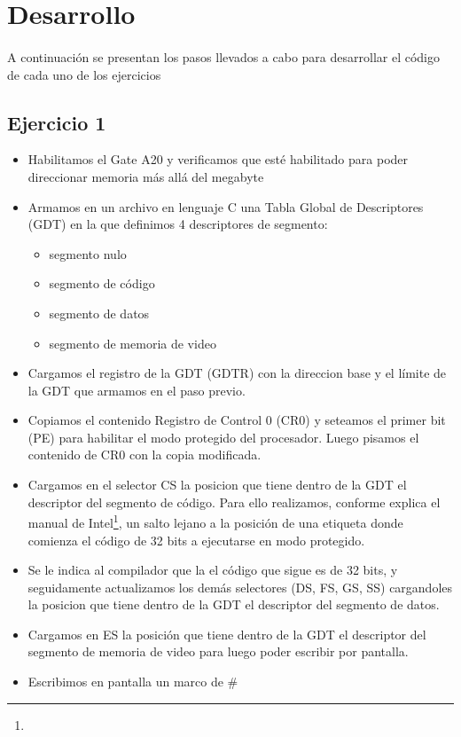 \section{Desarrollo}
\paragraph{}
A continuaci\'on se presentan los pasos llevados a cabo para desarrollar el c\'odigo de cada uno de los ejercicios

\subsection{Ejercicio 1}
\begin{itemize}
 \item Habilitamos el Gate A20 y verificamos que est\'e habilitado para poder direccionar memoria m\'as all\'a del megabyte
 \item Armamos en un archivo en lenguaje C una Tabla Global de Descriptores (GDT) en la que definimos 4 descriptores de segmento: 
	\begin{itemize}
	\item segmento nulo
	\item segmento de c\'odigo
	\item segmento de datos
	\item segmento de memoria de video
	\end{itemize}

 \item Cargamos el registro de la GDT (GDTR) con la direccion base  y el l\'imite de la GDT que armamos en el paso previo.

 \item Copiamos el contenido Registro de Control 0 (CR0) y seteamos el primer bit (PE) para habilitar el modo protegido del procesador. Luego pisamos el contenido de CR0 con la copia modificada.

 \item Cargamos en el selector CS la posicion que tiene dentro de la GDT el descriptor del segmento de c\'odigo. Para ello realizamos, conforme explica el manual de Intel\footnote{}, un salto lejano a la posici\'on de una etiqueta donde comienza el c\'odigo de 32 bits a ejecutarse en modo protegido.

 \item Se le indica al compilador que la el c\'odigo que sigue es de 32 bits, y seguidamente actualizamos los dem\'as selectores (DS, FS, GS, SS) cargandoles la posicion que tiene dentro de la GDT el descriptor del segmento de datos.

 \item Cargamos en ES la posici\'on que tiene dentro de la GDT el descriptor del segmento de memoria de video para luego poder escribir por pantalla.
 
 \item Escribimos en pantalla un marco de \#
\end{itemize}

